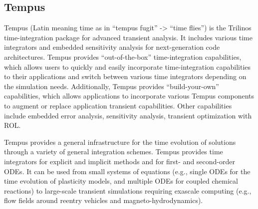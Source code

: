 \subsection{Tempus}

Tempus (Latin meaning time as in “tempus fugit” -> “time flies”)
is the Trilinos time-integration package for advanced transient
analysis.  It includes various time integrators and embedded
sensitivity analysis for next-generation code architectures.  Tempus
provides “out-of-the-box” time-integration capabilities, which
allows users to quickly and easily incorporate time-integration
capabilities to their applications and switch between various time
integrators depending on the simulation needs.  Additionally, Tempus
provides “build-your-own” capabilities, which allows applications
to incorporate various Tempus components to augment or replace
application transient capabilities. Other capabilities include
embedded error analysis, sensitivity analysis, transient optimization
with ROL.

Tempus provides a general infrastructure for the time evolution of
solutions through a variety of general integration schemes.  Tempus
provides time integrators for explicit and implicit methods and for
first- and second-order ODEs.  It can be used from small systems of
equations (e.g., single ODEs for the time evolution of plasticity
models, and multiple ODEs for coupled chemical reactions) to
large-scale transient simulations requiring exascale computing
(e.g., flow fields around reentry vehicles and magneto-hydrodynamics).

